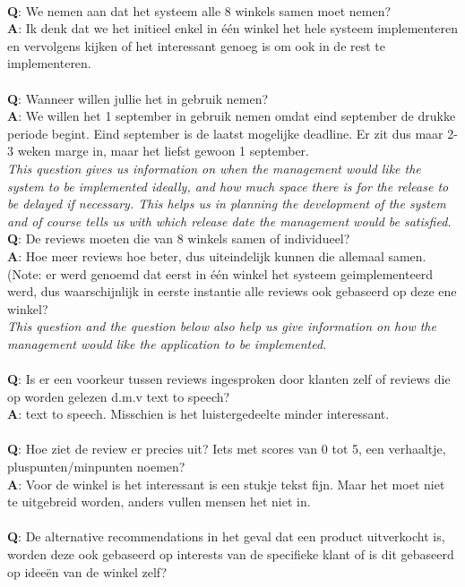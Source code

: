 \documentclass[a4paper]{article}
\begin{document}
\\
\textbf{Q}: We nemen aan dat het systeem alle 8 winkels samen moet nemen?\\
\textbf{A}: Ik denk dat we het initieel enkel in één winkel het hele systeem implementeren en vervolgens kijken of het interessant genoeg is om ook in de rest te implementeren.\\
\\
\textbf{Q}: Wanneer willen jullie het in gebruik nemen?\\
\textbf{A}: We willen het 1 september in gebruik nemen omdat eind september de drukke periode begint. Eind september is de laatst mogelijke deadline. Er zit dus maar 2-3 weken marge in, maar het liefst gewoon 1 september.\\
\textit{This question gives us information on when the management would like the system to be implemented ideally, and how much space there is for the release to be delayed if necessary. This helps us in planning the development of the system and of course tells us with which release date the management would be satisfied. }
\\
\textbf{Q}: De reviews moeten die van 8 winkels samen of individueel?\\
\textbf{A}: Hoe meer reviews hoe beter, dus uiteindelijk kunnen die allemaal samen. (Note: er werd genoemd dat eerst in één winkel het systeem geimplementeerd werd, dus waarschijnlijk in eerste instantie alle reviews ook gebaseerd op deze ene winkel?\\
\textit{This question and the question below also help us give information on how the management would like the application to be implemented.}\\
\\
\textbf{Q}: Is er een voorkeur tussen reviews ingesproken door klanten zelf of reviews die op worden gelezen d.m.v text to speech?\\
\textbf{A}: text to speech. Misschien is het luistergedeelte minder interessant.\\
\\
\textbf{Q}: Hoe ziet de review er precies uit? Iets met scores van 0 tot 5, een verhaaltje, pluspunten/minpunten noemen? \\
\textbf{A}: Voor de winkel is het interessant is een stukje tekst fijn. Maar het moet niet te uitgebreid worden, anders vullen mensen het niet in.\\
\\
\textbf{Q}: De alternative recommendations in het geval dat een product uitverkocht is, worden deze ook gebaseerd op interests van de specifieke klant of is dit gebaseerd op ideeën van de winkel zelf?\\
\end{document}
